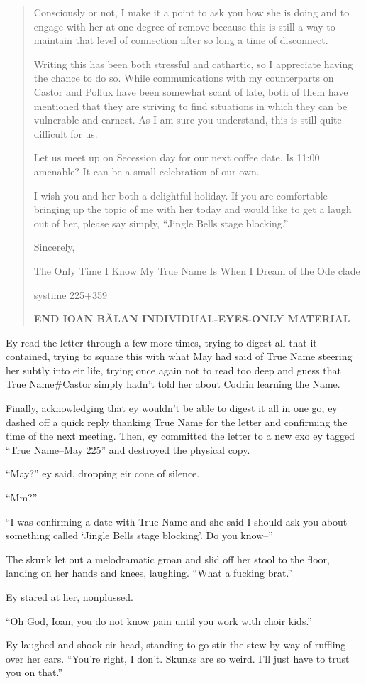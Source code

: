 \begin{quote}
Consciously or not, I make it a point to ask you how she is doing and to engage with her at one degree of remove because this is still a way to maintain that level of connection after so long a time of disconnect.

Writing this has been both stressful and cathartic, so I appreciate having the chance to do so. While communications with my counterparts on Castor and Pollux have been somewhat scant of late, both of them have mentioned that they are striving to find situations in which they can be vulnerable and earnest. As I am sure you understand, this is still quite difficult for us.

Let us meet up on Secession day for our next coffee date. Is 11:00 amenable? It can be a small celebration of our own.

I wish you and her both a delightful holiday. If you are comfortable bringing up the topic of me with her today and would like to get a laugh out of her, please say simply, ``Jingle Bells stage blocking.''

Sincerely,

The Only Time I Know My True Name Is When I Dream of the Ode clade

systime 225+359

\textbf{END IOAN BĂLAN INDIVIDUAL-EYES-ONLY MATERIAL}
\end{quote}

Ey read the letter through a few more times, trying to digest all that it contained, trying to square this with what May had said of True Name steering her subtly into eir life, trying once again not to read too deep and guess that True Name\#Castor simply hadn't told her about Codrin learning the Name.

Finally, acknowledging that ey wouldn't be able to digest it all in one go, ey dashed off a quick reply thanking True Name for the letter and confirming the time of the next meeting. Then, ey committed the letter to a new exo ey tagged ``True Name--May 225'' and destroyed the physical copy.

``May?'' ey said, dropping eir cone of silence.

``Mm?''

``I was confirming a date with True Name and she said I should ask you about something called `Jingle Bells stage blocking'. Do you know--''

The skunk let out a melodramatic groan and slid off her stool to the floor, landing on her hands and knees, laughing. ``What a fucking brat.''

Ey stared at her, nonplussed.

``Oh God, Ioan, you do not know pain until you work with choir kids.''

Ey laughed and shook eir head, standing to go stir the stew by way of ruffling over her ears. ``You're right, I don't. Skunks are so weird. I'll just have to trust you on that.''
